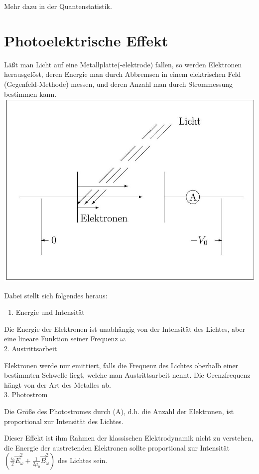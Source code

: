 \documentclass[10pt, letterpaper]{article}
\begin{document}
Mehr dazu in der Quantenstatistik.

\section*{Photoelektrische Effekt}
Läßt man Licht auf eine Metallplatte(-elektrode) fallen, so werden Elektronen herausgelöst, deren Energie man durch Abbremsen in einem elektrischen Feld (Gegenfeld-Methode) messen, und deren Anzahl man durch Strommessung bestimmen kann.\\
\includegraphics[scale=0.2, center]{2025_05_21_7e716008973ee1b5e8beg-05}

Dabei stellt sich folgendes heraus:

\begin{enumerate}
  \item Energie und Intensität
\end{enumerate}

Die Energie der Elektronen ist unabhängig von der Intensität des Lichtes, aber eine lineare Funktion seiner Frequenz $\omega$.\\
2. Austrittsarbeit

Elektronen werde nur emittiert, falls die Frequenz des Lichtes oberhalb einer bestimmten Schwelle liegt, welche man Austrittsarbeit nennt. Die Grenzfrequenz hängt von der Art des Metalles ab.\\
3. Photostrom

Die Größe des Photostromes durch (A), d.h. die Anzahl der Elektronen, ist proportional zur Intensität des Lichtes.

Dieser Effekt ist ihm Rahmen der klassischen Elektrodynamik nicht zu verstehen, die Energie der austretenden Elektronen sollte proportional zur Intensität $\left(\frac{\epsilon_{0}}{2} \vec{E}_{\omega}^{2}+\frac{1}{2 \mu_{0}} \vec{B}_{\omega}^{2}\right)$ des Lichtes sein.
\end{document}
